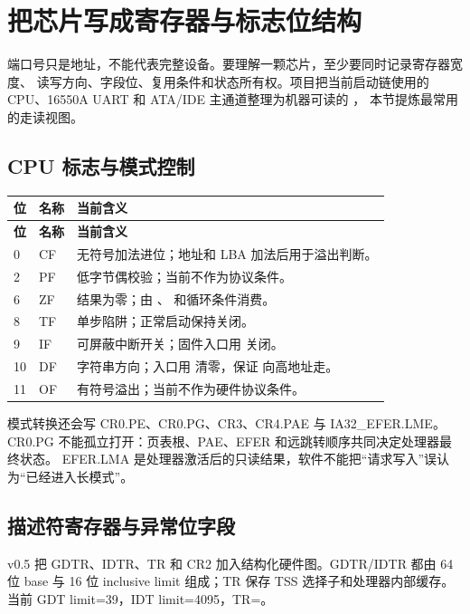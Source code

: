 \section{把芯片写成寄存器与标志位结构}

端口号只是地址，不能代表完整设备。要理解一颗芯片，至少要同时记录寄存器宽度、
读写方向、字段位、复用条件和状态所有权。项目把当前启动链使用的 CPU、16550A
UART 和 ATA/IDE 主通道整理为机器可读的 ，
本节提炼最常用的走读视图。

\subsection{CPU 标志与模式控制}

\begin{longtable}{L{0.12\textwidth}L{0.16\textwidth}L{0.56\textwidth}}
\toprule
\textbf{位} & \textbf{名称} & \textbf{当前含义}\\
\midrule
\endfirsthead
\toprule
\textbf{位} & \textbf{名称} & \textbf{当前含义}\\
\midrule
{} & CF & 无符号加法进位；地址和 LBA 加法后用于溢出判断。\\
2 & PF & 低字节偶校验；当前不作为协议条件。\\
6 & ZF & 结果为零；由 、 和循环条件消费。\\
8 & TF & 单步陷阱；正常启动保持关闭。\\
9 & IF & 可屏蔽中断开关；固件入口用  关闭。\\
10 & DF & 字符串方向；入口用  清零，保证  向高地址走。\\
11 & OF & 有符号溢出；当前不作为硬件协议条件。\\
\bottomrule
\end{longtable}

模式转换还会写 CR0.PE、CR0.PG、CR3、CR4.PAE 与 IA32\_EFER.LME。CR0.PG
不能孤立打开：页表根、PAE、EFER 和远跳转顺序共同决定处理器最终状态。
EFER.LMA 是处理器激活后的只读结果，软件不能把“请求写入”误认为“已经进入长模式”。

\subsection{描述符寄存器与异常位字段}

v0.5 把 GDTR、IDTR、TR 和 CR2 加入结构化硬件图。GDTR/IDTR 都由 64 位
base 与 16 位 inclusive limit 组成；TR 保存 TSS 选择子和处理器内部缓存。
当前 GDT limit=39，IDT limit=4095，TR=。


